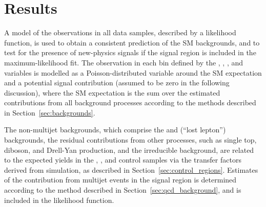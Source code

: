 \section{Results}
\label{sec:result}

A model of the observations in all data samples, described by a
likelihood function, is used to obtain a consistent prediction of the
SM backgrounds, and to test for the presence of new-physics signals if
the signal region is included in the maximum-likelihood fit. The
observation in each bin defined by the \njet, \nb, \scalht, and \HTmiss
variables is modelled as a Poisson-distributed variable around the SM
expectation and a potential signal contribution (assumed to be zero in
the following discussion), where the SM expectation is the sum over
the estimated contributions from all background processes according to
the methods described in Section~\ref{sec:backgrounds}.

The non-multijet backgrounds, which comprise the \wlj and \ttj (``lost
lepton'') backgrounds, the residual contributions from other
processes, such as single top, diboson, and Drell-Yan production, and
the irreducible \znunuj background, are related to the expected yields
in the \mj, \mmj, and \gj control samples via the transfer factors
derived from simulation, as described in
Section~\ref{sec:control_regions}. 
Estimates of the contribution from multijet events in the signal
region is determined according to the method described in
Section~\ref{sec:qcd_background}, and is included in the likelihood
function.


